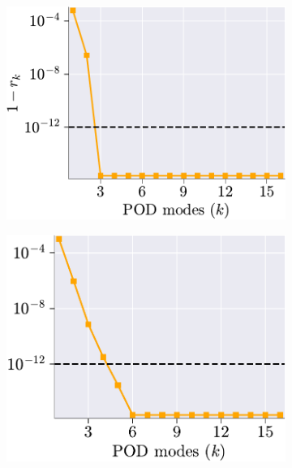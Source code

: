 \documentclass[11pt]{article}
\begin{document}
\begin{figure}[t]
\centering
\begin{subfigure}[b]{0.45\linewidth}
\centering
\includegraphics[width=\linewidth]{linear_Mode_selection.pdf}
\caption{}
\label{fig:HC_ROM_a}
\end{subfigure}
\begin{subfigure}[b]{0.45\linewidth}
\centering
\includegraphics[width=0.93\linewidth]{nonlinear_Mode_selection.pdf}
\caption{}
\label{fig:HC_ROM_b}
\end{subfigure}


\end{figure}
\end{document}
